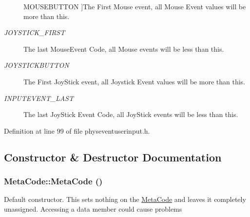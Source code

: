 \begin{Desc}
\begin{description}
{{MOUSEBUTTON}
\label{d7/d72/classMetaCode_a7390e6f58e25c0ce377bba4e63081b24a90e6bf109b0decae5cc828ebc5934dfa}
}]The First Mouse event, all Mouse Event values will be more than this. \item[{\em 
\hypertarget{classMetaCode_a7390e6f58e25c0ce377bba4e63081b24aa3222db6ab303f525a1a0c87603d806c}{
JOYSTICK\_\-FIRST}
\label{d7/d72/classMetaCode_a7390e6f58e25c0ce377bba4e63081b24aa3222db6ab303f525a1a0c87603d806c}
}]The last MouseEvent Code, all Mouse events will be less than this. \item[{\em 
\hypertarget{classMetaCode_a7390e6f58e25c0ce377bba4e63081b24ab52ae2c161faf882271ec71ded86501f}{
JOYSTICKBUTTON}
\label{d7/d72/classMetaCode_a7390e6f58e25c0ce377bba4e63081b24ab52ae2c161faf882271ec71ded86501f}
}]The First JoyStick event, all Joystick Event values will be more than this. \item[{\em 
\hypertarget{classMetaCode_a7390e6f58e25c0ce377bba4e63081b24ad1ca5de26bcaae04a631fdaa13e5749f}{
INPUTEVENT\_\-LAST}
\label{d7/d72/classMetaCode_a7390e6f58e25c0ce377bba4e63081b24ad1ca5de26bcaae04a631fdaa13e5749f}
}]The last JoyStick Event Code, all JoyStick events will be less than this. \end{description}
\end{Desc}



Definition at line 99 of file physeventuserinput.h.

\subsection{Constructor \& Destructor Documentation}
\hypertarget{classMetaCode_a6d4637b2894e5a2d46577c08259a2416}{
\subsubsection[{MetaCode}]{\setlength{\rightskip}{0pt plus 5cm}MetaCode::MetaCode ()}}
\label{d7/d72/classMetaCode_a6d4637b2894e5a2d46577c08259a2416}


Default constructor. This sets nothing on the \hyperlink{classMetaCode}{MetaCode} and leaves it completely unassigned. Accessing a data member could cause problems 

